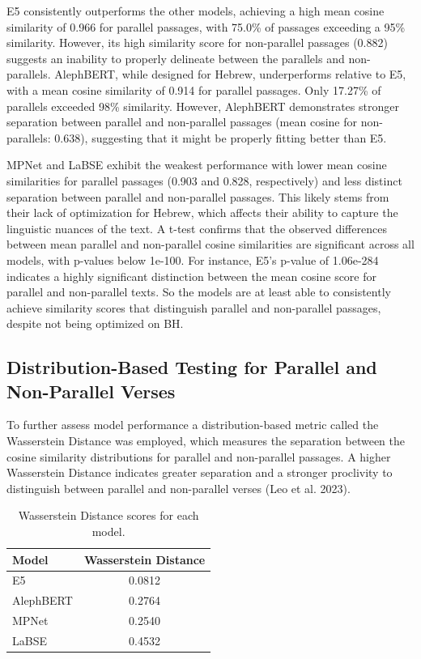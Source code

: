 \documentclass[12pt]{article}
\begin{document}
E5 consistently outperforms the other models, achieving a high mean cosine similarity of 0.966 for parallel passages, with 75.0\% of passages exceeding a 95\% similarity. However, its high similarity score for non-parallel passages (0.882) suggests an inability to properly delineate between the parallels and non-parallels. AlephBERT, while designed for Hebrew, underperforms relative to E5, with a mean cosine similarity of 0.914 for parallel passages. Only 17.27\% of parallels exceeded 98\% similarity. However, AlephBERT demonstrates stronger separation between parallel and non-parallel passages (mean cosine for non-parallels: 0.638), suggesting that it might be properly fitting better than E5.

MPNet and LaBSE exhibit the weakest performance with lower mean cosine similarities for parallel passages (0.903 and 0.828, respectively) and less distinct separation between parallel and non-parallel passages. This likely stems from their lack of optimization for Hebrew, which affects their ability to capture the linguistic nuances of the text.
A t-test confirms that the observed differences between mean parallel and non-parallel cosine similarities are significant across all models, with p-values below 1e-100. For instance, E5’s p-value of 1.06e-284 indicates a highly significant distinction between the mean cosine score for parallel and non-parallel texts. So the models are at least able to consistently achieve similarity scores that distinguish parallel and non-parallel passages, despite not being optimized on BH.

\subsection{Distribution-Based Testing for Parallel and Non-Parallel Verses}
To further assess model performance a distribution-based metric called the Wasserstein Distance was employed, which measures the separation between the cosine similarity distributions for parallel and non-parallel passages. A higher Wasserstein Distance indicates greater separation and a stronger proclivity to distinguish between parallel and non-parallel verses (Leo et al. 2023). 
\begin{table}[htbp]
\centering
\label{tab:wasserstein}
\begin{tabular}{@{}lc@{}}
\toprule
\textbf{Model} & \textbf{Wasserstein Distance} \\ 
\midrule
E5         & 0.0812 \\
AlephBERT  & 0.2764 \\
MPNet      & 0.2540 \\
LaBSE      & 0.4532 \\
\bottomrule
\end{tabular}
\caption{Wasserstein Distance scores for each model.}
\end{table}
\end{document}
